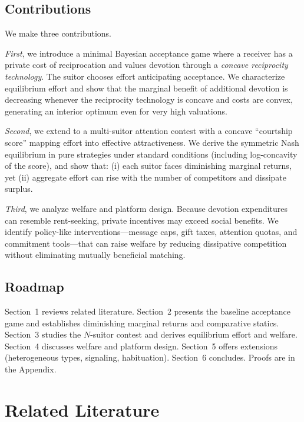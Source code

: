 \documentclass[AER]{AEA}
\begin{document}
\subsection*{Contributions}

We make three contributions.

\textit{First}, we introduce a minimal Bayesian acceptance game where a receiver has a
private cost of reciprocation and values devotion through a \textit{concave reciprocity
technology}. The suitor chooses effort anticipating acceptance. We characterize
equilibrium effort and show that the marginal benefit of additional devotion is decreasing
whenever the reciprocity technology is concave and costs are convex, generating an
interior optimum even for very high valuations.

\textit{Second}, we extend to a multi-suitor attention contest with a concave ``courtship
score'' mapping effort into effective attractiveness. We derive the symmetric Nash
equilibrium in pure strategies under standard conditions (including log-concavity of the
score), and show that: (i) each suitor faces diminishing marginal returns, yet (ii)
aggregate effort can rise with the number of competitors and dissipate surplus.

\textit{Third}, we analyze welfare and platform design. Because devotion expenditures can
resemble rent-seeking, private incentives may exceed social benefits. We identify
policy-like interventions---message caps, gift taxes, attention quotas, and commitment
tools---that can raise welfare by reducing dissipative competition without eliminating
mutually beneficial matching.

\subsection*{Roadmap}

Section~1 reviews related literature. Section~2 presents the baseline acceptance game and
establishes diminishing marginal returns and comparative statics. Section~3 studies the
$N$-suitor contest and derives equilibrium effort and welfare. Section~4 discusses welfare
and platform design. Section~5 offers extensions (heterogeneous types, signaling,
habituation). Section~6 concludes. Proofs are in the Appendix.

\section{Related Literature}
\end{document}
